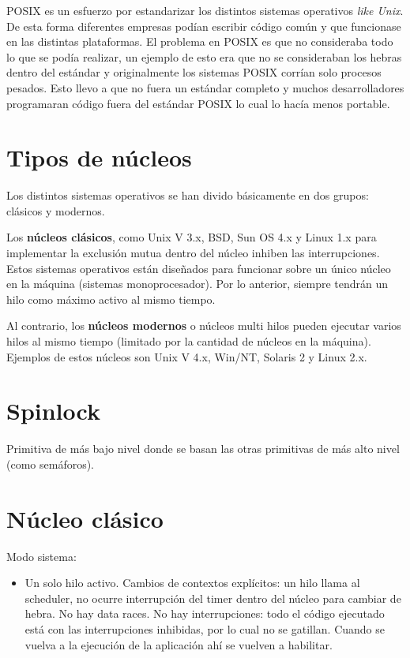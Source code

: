 POSIX es un esfuerzo por estandarizar los distintos sistemas operativos \textit{like Unix}. De esta forma diferentes empresas podían escribir código común y que funcionase en las distintas plataformas. El problema en POSIX es que no consideraba todo lo que se podía realizar, un ejemplo de esto era que no se consideraban los hebras dentro del estándar y originalmente los sistemas POSIX corrían solo procesos pesados. Esto llevo a que no fuera un estándar completo y muchos desarrolladores programaran código fuera del estándar POSIX lo cual lo hacía menos portable.

\section{Tipos de núcleos}

Los distintos sistemas operativos se han divido básicamente en dos grupos: clásicos y modernos.

Los \textbf{núcleos clásicos}, como Unix V 3.x, BSD, Sun OS 4.x y Linux 1.x para implementar la exclusión mutua dentro del núcleo inhiben las interrupciones. Estos sistemas operativos están diseñados para funcionar sobre un único núcleo en la máquina (sistemas monoprocesador). Por lo anterior, siempre tendrán un hilo como máximo activo al mismo tiempo.

Al contrario, los \textbf{núcleos modernos} o núcleos multi hilos pueden ejecutar varios hilos al mismo tiempo (limitado por la cantidad de núcleos en la máquina). Ejemplos de estos núcleos son Unix V 4.x, Win/NT, Solaris 2 y Linux 2.x.

\section{Spinlock}

Primitiva de más bajo nivel donde se basan las otras primitivas de más alto nivel (como semáforos).


\section{Núcleo clásico}

Modo sistema:
\begin{itemize}
	\item Un solo hilo activo.
Cambios de contextos explícitos: un hilo llama al scheduler, no ocurre interrupción del timer dentro del núcleo para cambiar de hebra.
No hay data races.
No hay interrupciones: todo el código ejecutado está con las interrupciones inhibidas, por lo cual no se gatillan. Cuando se vuelva a la ejecución de la aplicación ahí se vuelven a habilitar.
\end{itemize}


